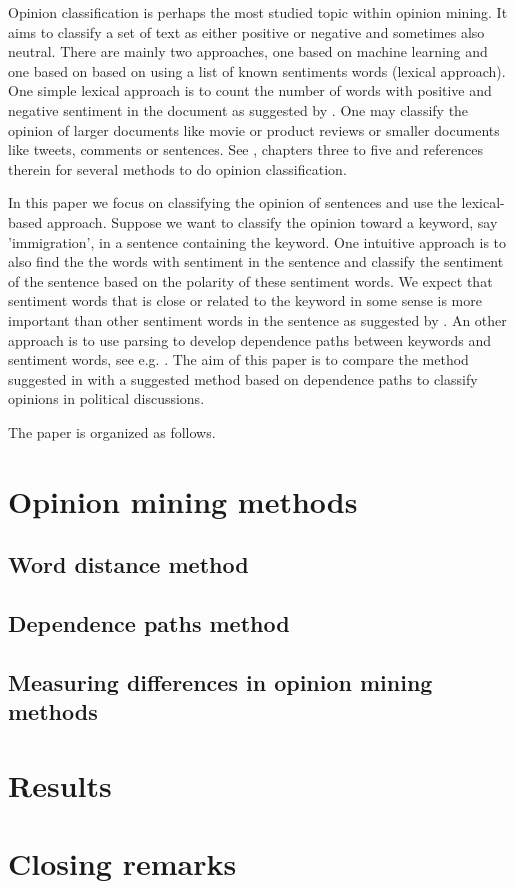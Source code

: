 \documentclass[a4paper, 12pt]{article}
\begin{document}
Opinion classification is perhaps the most studied topic within opinion mining. It aims to classify a set of text as either positive or negative and sometimes also neutral. There are mainly two approaches, one based on machine learning and one based on based on using a list of known sentiments words (lexical approach). One simple lexical approach is to count the number of words with positive and negative sentiment in the document as suggested by \citet{Hu04}. One may classify the opinion of larger documents like movie or product reviews or smaller documents like tweets, comments or sentences. See \citet{Bing12}, chapters three to five and references therein for several methods to do opinion classification. 

In this paper we focus on classifying the opinion of sentences and use the lexical-based approach. Suppose we want to classify the opinion toward a keyword, say 'immigration', in a sentence containing the keyword. One intuitive approach is to also find the the words with sentiment in the sentence and classify the sentiment of the sentence based on the polarity of these sentiment words. We expect that sentiment words that is close or related to the keyword in some sense is more important than other sentiment words in the sentence as suggested by \citet{Ding08}. An other approach is to use parsing to develop dependence paths between keywords and sentiment words, see e.g. \citet{Jiang11}. The aim of this paper is to compare the method suggested in \citet{Ding08} with a suggested method based on dependence paths to classify opinions in political discussions.

The paper is organized as follows. 

\section{Opinion mining methods}
\label{sec:om}

\subsection{Word distance method}
\label{sec:wd}

\subsection{Dependence paths method}
\label{sec:dp}

\subsection{Measuring differences in opinion mining methods}
\label{sec:diff}

\section{Results}
\label{sec:results}

\section{Closing remarks}
\label{sec:cr}


\end{document}
